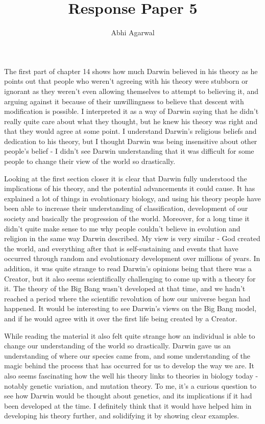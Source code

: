 \documentclass[11pt, oneside]{article}
\title{Response Paper 5}
\author{Abhi Agarwal}
\date{}
\begin{document}
\maketitle

\par The first part of chapter 14 shows how much Darwin believed in his theory as he points out that people who weren't agreeing with his theory were stubborn or ignorant as they weren't even allowing themselves to attempt to believing it, and arguing against it because of their unwillingness to believe that descent with modification is possible. I interpreted it as a way of Darwin saying that he didn't really quite care about what they thought, but he knew his theory was right and that they would agree at some point. I understand Darwin's religious beliefs and dedication to his theory, but I thought Darwin was being insensitive about other people's belief - I didn't see Darwin understanding that it was difficult for some people to change their view of the world so drastically. 

\par Looking at the first section closer it is clear that Darwin fully understood the implications of his theory, and the potential advancements it could cause. It has explained a lot of things in evolutionary biology, and using his theory people have been able to increase their understanding of classification, development of our society and basically the progression of the world. Moreover, for a long time it didn't quite make sense to me why people couldn't believe in evolution and religion in the same way Darwin described. My view is very similar - God created the world, and everything after that is self-sustaining and events that have occurred through random and evolutionary development over millions of years. In addition, it was quite strange to read Darwin's opinions being that there was a Creator, but it also seems scientifically challenging to come up with a theory for it.  The theory of the Big Bang wasn't developed at that time, and we hadn't reached a period where the scientific revolution of how our universe began had happened. It would be interesting to see Darwin's views on the Big Bang model, and if he would agree with it over the first life being created by a Creator.

\par While reading the material it also felt quite strange how an individual is able to change our understanding of the world so drastically. Darwin gave us an understanding of where our species came from, and some understanding of the magic behind the process that has occurred for us to develop the way we are. It also seems fascinating how the well his theory links to theories in biology today - notably genetic variation, and mutation theory. To me, it's a curious question to see how Darwin would be thought about genetics, and its implications if it had been developed at the time. I definitely think that it would have helped him in developing his theory further, and solidifying it by showing clear examples.
\end{document}

